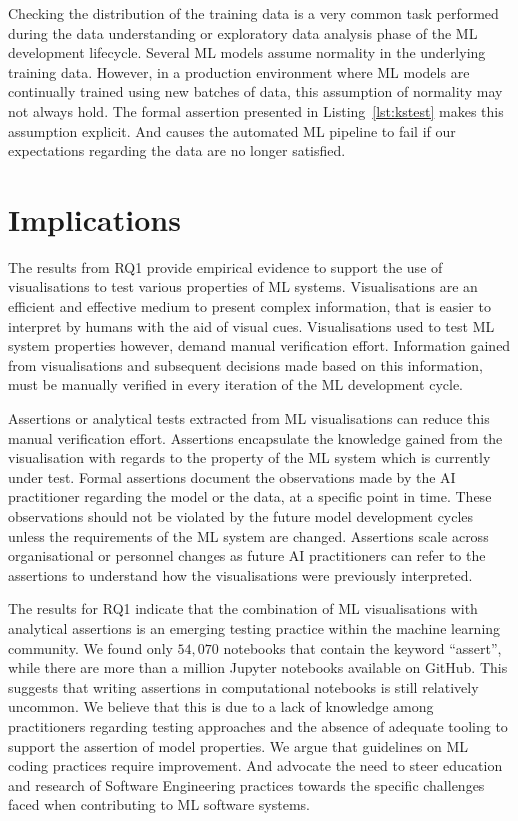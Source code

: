 \documentclass[conference]{IEEEtran}
\begin{document}
Checking the distribution of the training data is a very common task performed during the data understanding or exploratory data analysis phase of the ML development lifecycle. Several ML models assume normality in the underlying training data. However, in a production environment where ML models are continually trained using new batches of data, this assumption of normality may not always hold. The formal assertion presented in Listing~\ref{lst:kstest} makes this assumption explicit. And causes the automated ML pipeline to fail if our expectations regarding the data are no longer satisfied.

\section{Implications}\label{sec:discuss}

The results from RQ1 provide empirical evidence to support the use of visualisations to test various properties of ML systems. Visualisations are an efficient and effective medium to present complex information, that is easier to interpret by humans with the aid of visual cues. Visualisations used to test ML system properties however, demand manual verification effort. Information gained from visualisations and subsequent decisions made based on this information, must be manually verified in every iteration of the ML development cycle.


Assertions or analytical tests extracted from ML visualisations can reduce this manual verification effort. Assertions encapsulate the knowledge gained from the visualisation with regards to the property of the ML system which is currently under test. Formal assertions document the observations made by the AI practitioner regarding the model or the data, at a specific point in time. These observations should not be violated by the future model development cycles unless the requirements of the ML system are changed. Assertions scale across organisational or personnel changes as future AI practitioners can refer to the assertions to understand how the visualisations were previously interpreted.

The results for RQ1 indicate that the combination of ML visualisations with analytical assertions is an emerging testing practice within the machine learning community. We found only $54,070$ notebooks that contain the keyword ``assert'', while there are more than a million Jupyter notebooks available on GitHub. This suggests that writing assertions in computational notebooks is still relatively uncommon. We believe that this is due to a lack of knowledge among practitioners regarding testing approaches and the absence of adequate tooling to support the assertion of model properties. We argue that guidelines on ML coding practices require improvement. And advocate the need to steer education and research of Software Engineering practices towards the specific challenges faced when contributing to ML software systems.
\end{document}
